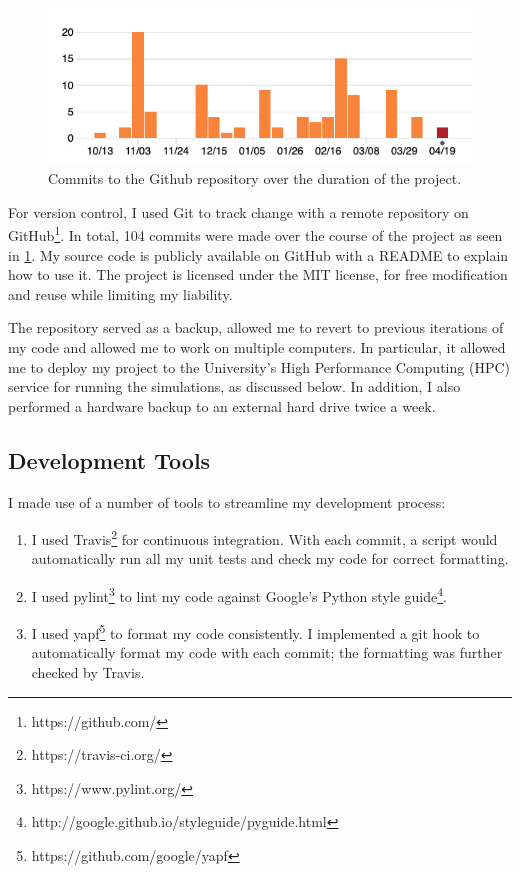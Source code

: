 \documentclass[12pt,a4paper]{report}
\begin{document}
\begin{figure}[ht]
  \centering
  \includegraphics[width=.9\linewidth]{figs/commits.jpg}
  \caption{Commits to the Github repository over the duration of the project.}
  \label{fig:commits}
\end{figure}

For version control, I used Git to track change with a remote repository on GitHub\footnote{https://github.com/}. In total, 104 commits were made over the course of the project as seen in \cref{fig:commits}. My source code is publicly available on GitHub with a README to explain how to use it. The project is licensed under the MIT license, for free modification and reuse while limiting my liability.

The repository served as a backup, allowed me to revert to previous iterations of my code and allowed me to work on multiple computers. In particular, it allowed me to deploy my project to the University's High Performance Computing (HPC) service for running the simulations, as discussed below. In addition, I also performed a hardware backup to an external hard drive twice a week.

\subsection{Development Tools}

I made use of a number of tools to streamline my development process:

\begin{enumerate}

\item I used Travis\footnote{https://travis-ci.org/} for continuous integration. With each commit, a script would automatically run all my unit tests and check my code for correct formatting.
	
\item I used pylint\footnote{https://www.pylint.org/} to lint my code against Google's Python style guide\footnote{http://google.github.io/styleguide/pyguide.html}.
	
\item I used yapf\footnote{https://github.com/google/yapf} to format my code consistently. I implemented a git hook to automatically format my code with each commit; the formatting was further checked by Travis.
	
\end{enumerate}
\end{document}
